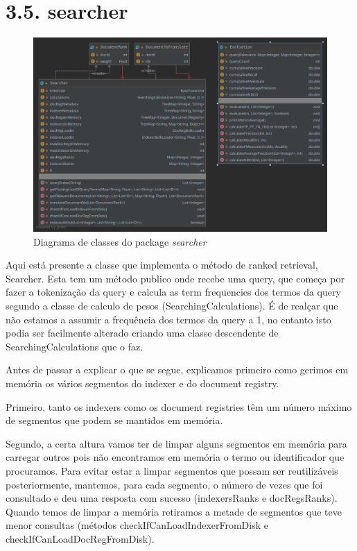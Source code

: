 \documentclass[12pt]{article}
\begin{document}
\section*{3.5. searcher}
\begin{figure}[H]
  \center
   \includegraphics[width=\linewidth]{packages_searcher.png}
  \caption{Diagrama de classes do package \it searcher}
\end{figure}

Aqui está presente a classe que implementa o método de ranked
retrieval, Searcher.
Esta tem um método publico onde recebe uma query, que começa por
fazer a tokenização da query e calcula as term frequencies dos termos
da query segundo a classe de calculo de pesos
(SearchingCalculations).
É de realçar que não estamos a assumir a frequência dos termos da
query a 1, no entanto isto podia ser facilmente alterado criando uma
classe descendente de SearchingCalculations que o faz.

Antes de passar a explicar o que se segue, explicamos primeiro como
gerimos em memória os vários segmentos do indexer e do document
registry.

Primeiro, tanto os indexers como os document registries têm um número
máximo de segmentos que podem se mantidos em memória.

Segundo, a certa altura vamos ter de limpar alguns segmentos em
memória para carregar outros pois não encontramos em memória o termo
ou identificador que procuramos.
Para evitar estar a limpar segmentos que possam ser reutilizáveis
posteriormente, mantemos, para cada segmento, o número de vezes que
foi consultado e deu uma resposta com sucesso (indexersRanks e
docRegsRanks).
Quando temos de limpar a memória retiramos a metade de segmentos que
teve menor consultas (métodos checkIfCanLoadIndexerFromDisk e
checkIfCanLoadDocRegFromDisk).
\end{document}

